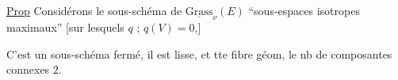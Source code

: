 
\uline{Prop} Considérons le sous-schéma de $\underline{\mathrm{Grass}}_\nu(E)$  ``sous-espaces isotropes maximaux'' [sur lesquels $q$    ; $q(V)=0$,] 

C'est un sous-schéma fermé, il est lisse, et  tte fibre géom, le nb de composantes connexes  $2$.

